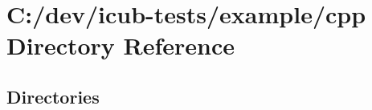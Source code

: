 \section{C\+:/dev/icub-\/tests/example/cpp Directory Reference}
\label{dir_c4278cdbadca2a5e8f60a98cd2517319}
\subsection*{Directories}
\begin{DoxyCompactItemize}
\end{DoxyCompactItemize}

